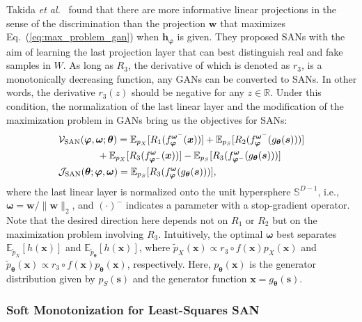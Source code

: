 \documentclass{article}
\def\beqref#1{(\ref{#1})}
\newcommand{\E}{\mathbb{E}}
\newcommand{\Js}{\mathcal{J}}
\begin{document}
Takida \textit{et al.}~\cite{takida2023san} found that there are more informative linear projections in the sense of the discrimination than the projection $\bm{w}$ that maximizes Eq.~\beqref{eq:max_problem_gan} when $\bm{h}_{\bm{\varphi}}$ is given. They proposed SANs with the aim of learning the last projection layer that can best distinguish real and fake samples in $W$. As long as $R_3$, the derivative of which is denoted as $r_3$, is a monotonically decreasing function, any GANs can be converted to SANs. In other words, the derivative $r_3(z)$ should be negative for any $z\in\mathbb{R}$. Under this condition, the normalization of the last linear layer and the modification of the maximization problem in GANs bring us the objectives for SANs:
\begin{align}
    &\mathcal{V}_{\text{SAN}}(\bm{\varphi},\bm{\omega};\bm{\theta})
    =\E_{p_X}[R_1(f_{\bm{\varphi}}^{\bm{\omega}^-}(\bm{x}))]
    +\E_{p_S}[R_2(f_{\bm{\varphi}}^{\bm{\omega}^-}(g_{\bm{\theta}}(\bm{s})))]\notag\\
    &\qquad\qquad
    +\E_{p_X}[R_3(f_{\bm{\varphi}^-}^{\bm{\omega}}(\bm{x}))]
    -\E_{p_S}[R_3(f_{\bm{\varphi}^-}^{\bm{\omega}}(g_{\bm{\theta}}(\bm{s})))]
    \label{eq:max_problem_san}\\
    &\Js_{\text{SAN}}(\bm{\theta};\bm{\varphi},\bm{\omega})
    =\E_{p_S}[R_3(f_{\bm{\varphi}}^{\bm{\omega}}(g_{\bm{\theta}}(\bm{s})))],
    \label{eq:min_problem_san}
\end{align}
where the last linear layer is normalized onto the unit hypersphere $\mathbb{S}^{D-1}$, i.e., $\bm{\omega}=\bm{w}/\|\bm{w}\|_2$, and $(\cdot)^-$ indicates a parameter with a stop-gradient operator.
Note that the desired direction here depends not on $R_1$ or $R_2$ but on the maximization problem involving $R_3$. Intuitively, the optimal $\bm{\omega}$ best separates $\E_{\tilde{p}_X}[h(\bm{x})]$ and $\E_{\tilde{p}_{\bm{\theta}}}[h(\bm{x})]$, where $\tilde{p}_X(\bm{x})\propto r_3\circ f(\bm{x})p_X(\bm{x})$ and $\tilde{p}_{\bm{\theta}}(\bm{x})\propto r_3\circ f(\bm{x})p_{\bm{\theta}}(\bm{x})$, respectively. Here, $p_{\bm{\theta}}(\bm{x})$ is the generator distribution given by $p_S(\bm{s})$ and the generator function $\bm{x}=g_{\bm{\theta}}(\bm{s})$.

\subsubsection{Soft Monotonization for Least-Squares SAN}
\label{sssec:least_square_san}
\end{document}
